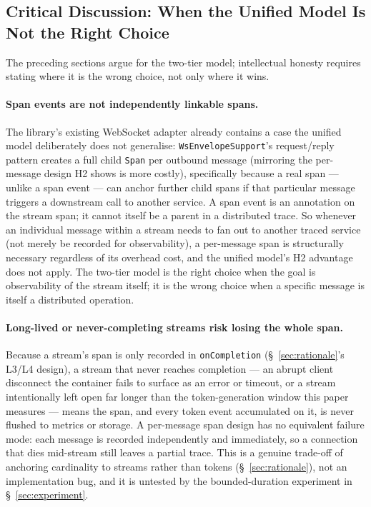 \documentclass[11pt]{article}
\begin{document}
\subsection{Critical Discussion: When the Unified Model Is Not the Right Choice}
\label{sec:tradeoffs}
The preceding sections argue for the two-tier model; intellectual honesty requires stating where it is the wrong choice, not only where it wins.

\paragraph{Span events are not independently linkable spans.} The library's existing WebSocket adapter already contains a case the unified model deliberately does not generalise: \texttt{WsEnvelopeSupport}'s request/reply pattern creates a full child \texttt{Span} per outbound message (mirroring the per-message design H2 shows is more costly), specifically because a real span --- unlike a span event --- can anchor further child spans if that particular message triggers a downstream call to another service. A span event is an annotation on the stream span; it cannot itself be a parent in a distributed trace. So whenever an individual message within a stream needs to fan out to another traced service (not merely be recorded for observability), a per-message span is structurally necessary regardless of its overhead cost, and the unified model's H2 advantage does not apply. The two-tier model is the right choice when the goal is observability of the stream itself; it is the wrong choice when a specific message is itself a distributed operation.

\paragraph{Long-lived or never-completing streams risk losing the whole span.} Because a stream's span is only recorded in \texttt{onCompletion} (\S~\ref{sec:rationale}'s L3/L4 design), a stream that never reaches completion --- an abrupt client disconnect the container fails to surface as an error or timeout, or a stream intentionally left open far longer than the token-generation window this paper measures --- means the span, and every token event accumulated on it, is never flushed to metrics or storage. A per-message span design has no equivalent failure mode: each message is recorded independently and immediately, so a connection that dies mid-stream still leaves a partial trace. This is a genuine trade-off of anchoring cardinality to streams rather than tokens (\S~\ref{sec:rationale}), not an implementation bug, and it is untested by the bounded-duration experiment in \S~\ref{sec:experiment}.
\end{document}
